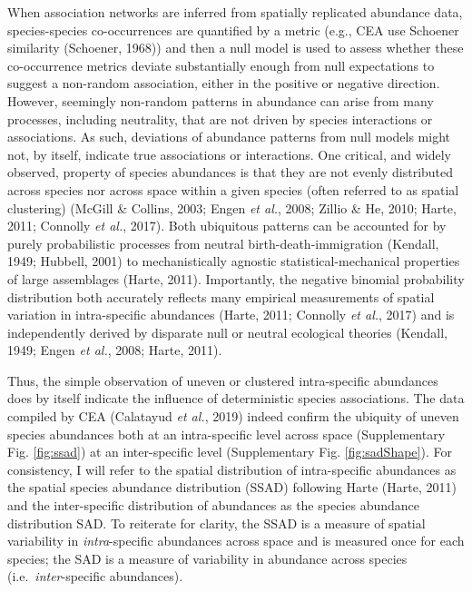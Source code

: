 \documentclass[
]{article}
\begin{document}
When association networks are inferred from spatially replicated
abundance data, species-species co-occurrences are quantified by a
metric (e.g., CEA use Schoener similarity (Schoener, 1968)) and then a
null model is used to assess whether these co-occurrence metrics deviate
substantially enough from null expectations to suggest a non-random
association, either in the positive or negative direction. However,
seemingly non-random patterns in abundance can arise from many
processes, including neutrality, that are not driven by species
interactions or associations. As such, deviations of abundance patterns
from null models might not, by itself, indicate true associations or
interactions. One critical, and widely observed, property of species
abundances is that they are not evenly distributed across species nor
across space within a given species (often referred to as spatial
clustering) (McGill \& Collins, 2003; Engen \emph{et al.}, 2008; Zillio
\& He, 2010; Harte, 2011; Connolly \emph{et al.}, 2017). Both ubiquitous
patterns can be accounted for by purely probabilistic processes from
neutral birth-death-immigration (Kendall, 1949; Hubbell, 2001) to
mechanistically agnostic statistical-mechanical properties of large
assemblages (Harte, 2011). Importantly, the negative binomial
probability distribution both accurately reflects many empirical
measurements of spatial variation in intra-specific abundances (Harte,
2011; Connolly \emph{et al.}, 2017) and is independently derived by
disparate null or neutral ecological theories (Kendall, 1949; Engen
\emph{et al.}, 2008; Harte, 2011).

Thus, the simple observation of uneven or clustered intra-specific
abundances does by itself indicate the influence of deterministic
species associations. The data compiled by CEA (Calatayud \emph{et al.},
2019) indeed confirm the ubiquity of uneven species abundances both at
an intra-specific level across space (Supplementary Fig. \ref{fig:ssad})
at an inter-specific level (Supplementary Fig. \ref{fig:sadShape}). For
consistency, I will refer to the spatial distribution of intra-specific
abundances as the spatial species abundance distribution (SSAD)
following Harte (Harte, 2011) and the inter-specific distribution of
abundances as the species abundance distribution SAD. To reiterate for
clarity, the SSAD is a measure of spatial variability in
\emph{intra}-specific abundances across space and is measured once for
each species; the SAD is a measure of variability in abundance across
species (i.e.~\emph{inter}-specific abundances).
\end{document}
